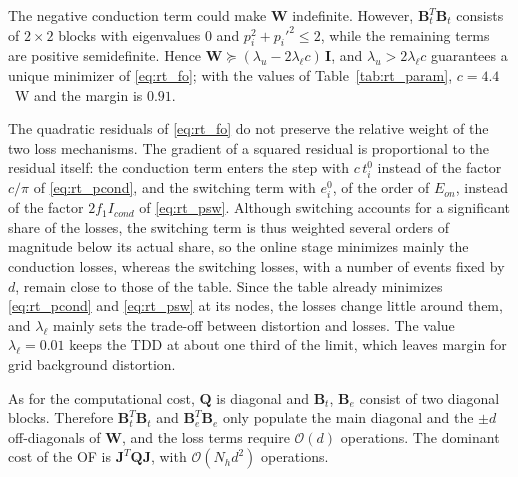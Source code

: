 \documentclass[conference]{IEEEtran}
\newcommand{\old}[1]{\par\smallskip\noindent{\color{gray}\footnotesize
    \textbf{[ANTES]} #1}\par\smallskip}
\renewcommand{\old}[1]{}       %
\begin{document}
The negative conduction term could make $\mathbf{W}$ indefinite. However,
$\mathbf{B}_t^T\mathbf{B}_t$ consists of $2\times2$ blocks with eigenvalues
$0$ and $p_i^2+p_i'^2\leq 2$, while the remaining terms are positive
semidefinite. Hence $\mathbf{W}\succeq(\lambda_u-2\lambda_{\ell}c)\,\mathbf{I}$,
and $\lambda_u > 2\lambda_{\ell}c$ guarantees a unique minimizer of
\eqref{eq:rt_fo}; with the values of Table~\ref{tab:rt_param},
$c = 4.4$~W and the margin is $0.91$.

The quadratic residuals of \eqref{eq:rt_fo} do not preserve the relative
weight of the two loss mechanisms. The gradient of a squared residual is
proportional to the residual itself: the conduction term enters the step
with $c\,t_i^0$ instead of the factor $c/\pi$ of \eqref{eq:rt_pcond}, and the
switching term with $e_i^0$, of the order of $E_{on}$, instead of the factor
$2f_1I_{cond}$ of \eqref{eq:rt_psw}. Although switching accounts for a
significant share of the losses, the switching term is thus weighted
several orders of magnitude below its actual share, so the online stage
minimizes mainly the conduction losses, whereas the switching losses, with
a number of events fixed by $d$, remain close to those of the table. Since
the table already minimizes \eqref{eq:rt_pcond} and \eqref{eq:rt_psw} at
its nodes, the losses change little around them, and $\lambda_\ell$ mainly
sets the trade-off between distortion and losses. The value
$\lambda_\ell=0.01$ keeps the TDD at about one third of the limit, which
leaves margin for grid background distortion.
\old{Although switching accounts for a significant share of the losses
(Fig.~\ref{fig:perdidas}), the switching term is thus weighted six to seven
orders of magnitude below its actual share, and the loss terms act as a
regularizer rather than as a loss minimizer. Starting from the table, which
already minimizes \eqref{eq:rt_pcond} and \eqref{eq:rt_psw} for the given
number of pulses, the losses are locally insensitive to the angles, and
$\lambda_\ell$ mainly sets the operating point along the distortion axis.
[Frase del barrido de $\lambda_\ell$: pasa a los resultados RT, comentada
al final de la Seccion de resultados.]}
As for the computational cost, $\mathbf{Q}$ is diagonal and $\mathbf{B}_t$,
$\mathbf{B}_e$ consist of two diagonal blocks. Therefore
$\mathbf{B}_t^T\mathbf{B}_t$ and $\mathbf{B}_e^T\mathbf{B}_e$ only populate
the main diagonal and the $\pm d$ off-diagonals of $\mathbf{W}$, and the
loss terms require $\mathcal{O}(d)$ operations. The dominant cost of the OF
is $\mathbf{J}^T\mathbf{Q}\mathbf{J}$, with $\mathcal{O}(N_h d^2)$
operations.
\end{document}
